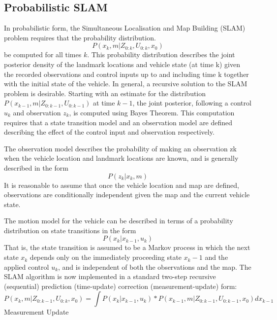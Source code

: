 \documentclass[12pt]{article}
\begin{document}
\subsection{Probabilistic SLAM}
In probabilistic form, the Simultaneous Localisation and Map Building (SLAM) problem requires that the probability distribution.
\begin{equation}
P(x_k,m|Z_{0:k},U_{0:k},x_0)
\end{equation}
be computed for all times $k$. This probability distribution describes the joint posterior density of the landmark locations and vehicle state (at time k) given the recorded observations and control inputs up to and including time k together with the initial state of the vehicle. In general, a recursive solution to the SLAM problem is desirable. Starting with an estimate for the distribution
$P(x_{k−1},m| Z_{0:k−1},U_{0:k−1})$ at time $k-1$, the joint posterior, following a control $u_k$ and observation $z_k$, is computed using Bayes Theorem. This computation requires that a state transition model and an observation model are defined describing the effect of the control input and observation respectively.
\par The observation model describes the probability of making an observation zk when the vehicle location and landmark locations are known, and is generally described in the form 
\begin{equation}
P(z_k | x_k,m)
\end{equation}
It is reasonable to assume that once the vehicle location and map are defined, observations are conditionally independent given the map and the current vehicle state.
\par The motion model for the vehicle can be described in terms of a probability distribution on state transitions in the form
\begin{equation}
P(x_k | x_{k-1},u_k)
\end{equation}
That is, the state transition is assumed to be a Markov process in which the next state $x_k$ depends only on the immediately proceeding state $x_k−1$ and the applied control $u_k$, and is independent of both the observations and the map.
The SLAM algorithm is now implemented in a standard two-step recursive (sequential) prediction (time-update) correction (measurement-update) form:
\begin{equation}
P(x_k,m| Z_{0:k-1},U_{0:k},x_0)=\int P(x_k | x_{k-1},u_k)*P(x_{k-1},m| Z_{0:k-1},U_{0:k-1},x_0)dx_{k-1}
\end{equation}
Measurement Update
\end{document}
